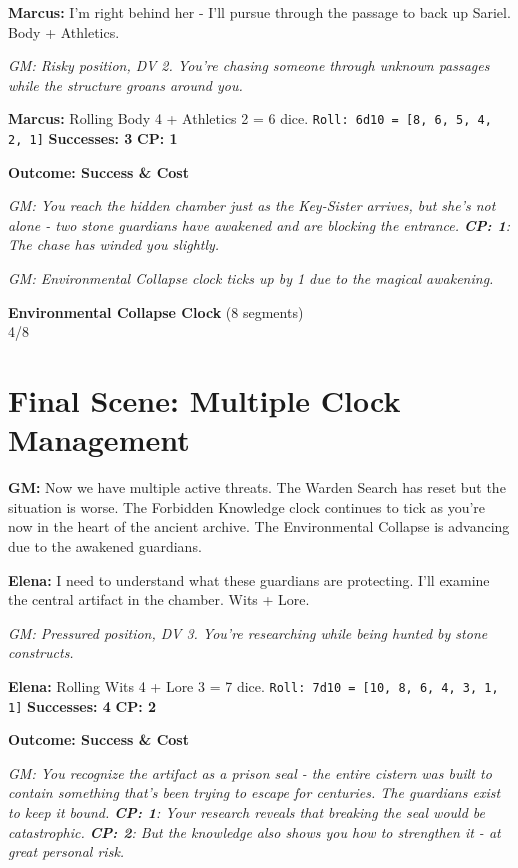 \documentclass[11pt]{article}
\newcommand{\player}[1]{\textbf{#1:}}
\newcommand{\gm}[1]{\textit{GM: #1}}
\newcommand{\roll}[2]{\texttt{Roll: #1d10 = [#2]}}
\newcommand{\success}[1]{\textbf{Successes: #1}}
\newcommand{\cp}[1]{\textbf{CP: #1}}
\newcommand{\outcome}[1]{\textbf{Outcome: #1}}
\newcommand{\clocksegment}{\textbullet}
\begin{document}
\player{Marcus} I'm right behind her - I'll pursue through the passage to back up Sariel. Body + Athletics.

\gm{Risky position, DV 2. You're chasing someone through unknown passages while the structure groans around you.}

\player{Marcus} Rolling Body 4 + Athletics 2 = 6 dice. \roll{6}{8, 6, 5, 4, 2, 1} \success{3} \cp{1}

\outcome{Success \& Cost}

\gm{You reach the hidden chamber just as the Key-Sister arrives, but she's not alone - two stone guardians have awakened and are blocking the entrance. \cp{1}: The chase has winded you slightly.}

\gm{Environmental Collapse clock ticks up by 1 due to the magical awakening.}

\begin{center}
\textbf{Environmental Collapse Clock} (8 segments)\\
\fbox{\textcolor{clockcolor}{\clocksegment\clocksegment\clocksegment\clocksegment}\clocksegment\clocksegment\clocksegment\clocksegment} 4/8
\end{center}

\section*{Final Scene: Multiple Clock Management}

\player{GM} Now we have multiple active threats. The Warden Search has reset but the situation is worse. The Forbidden Knowledge clock continues to tick as you're now in the heart of the ancient archive. The Environmental Collapse is advancing due to the awakened guardians.

\player{Elena} I need to understand what these guardians are protecting. I'll examine the central artifact in the chamber. Wits + Lore.

\gm{Pressured position, DV 3. You're researching while being hunted by stone constructs.}

\player{Elena} Rolling Wits 4 + Lore 3 = 7 dice. \roll{7}{10, 8, 6, 4, 3, 1, 1} \success{4} \cp{2}

\outcome{Success \& Cost}

\gm{You recognize the artifact as a prison seal - the entire cistern was built to contain something that's been trying to escape for centuries. The guardians exist to keep it bound. \cp{1}: Your research reveals that breaking the seal would be catastrophic. \cp{2}: But the knowledge also shows you how to strengthen it - at great personal risk.}
\end{document}

